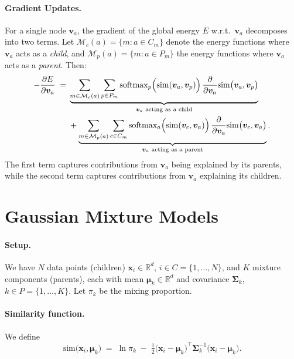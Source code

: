 \documentclass{article}
\begin{document}
\paragraph{Gradient Updates.}  
For a single node \(\bm{v}_a\), the gradient of the global energy \(E\) w.r.t.\ \(\bm{v}_a\) decomposes into two terms. Let \(\mathcal{M}_c(a) = \{m : a \in C_m\}\) denote the energy functions where \(\bm{v}_a\) acts as a \emph{child}, and \(\mathcal{M}_p(a) = \{m : a \in P_m\}\) the energy functions where \(\bm{v}_a\) acts as a \emph{parent}. Then:
\begin{equation}
\begin{aligned}
-\frac{\partial E}{\partial \bm{v}_a}
\;=\;&
\underbrace{
\sum_{m \in \mathcal{M}_c(a)} \sum_{p \in P_m}
\text{softmax}_{p} \Bigl(\mathrm{sim}(\bm{v}_a, \bm{v}_p)\Bigr)\,
\frac{\partial}{\partial \bm{v}_a}
\mathrm{sim}\bigl(\bm{v}_a, \bm{v}_p\bigr)
}_{\text{\(\bm{v}_a\) acting as a child}} \\
&+
\underbrace{
\sum_{m \in \mathcal{M}_p(a)} \sum_{c \in C_m}
\text{softmax}_{a} \Bigl(\mathrm{sim}(\bm{v}_c, \bm{v}_a)\Bigr)\,
\frac{\partial}{\partial \bm{v}_a}
\mathrm{sim}\bigl(\bm{v}_c, \bm{v}_a\bigr)
}_{\text{\(\bm{v}_a\) acting as a parent}}.
\end{aligned}
\end{equation}
The first term captures contributions from \(\bm{v}_a\) being explained by its parents, while the second term captures contributions from \(\bm{v}_a\) explaining its children.


\section{Gaussian Mixture Models}

\paragraph{Setup.} 
We have \(N\) data points (children) \(\bm{x}_i \in \mathbb{R}^d\), \(i \in C = \{1,\ldots,N\}\), and \(K\) mixture components (parents), each with mean \(\bm{\mu}_k \in \mathbb{R}^d\) and covariance \(\bm{\Sigma}_k\), \(k \in P = \{1,\ldots,K\}\).  Let \(\pi_k\) be the mixing proportion.

\paragraph{Similarity function.}
We define
\[
\mathrm{sim}\bigl(\bm{x}_i, \bm{\mu}_k\bigr)
\;=\;
\ln \pi_k
\;-\;
\tfrac12 \bigl(\bm{x}_i - \bm{\mu}_k\bigr)^\top
\bm{\Sigma}_k^{-1}
\bigl(\bm{x}_i - \bm{\mu}_k\bigr).
\]
\end{document}
